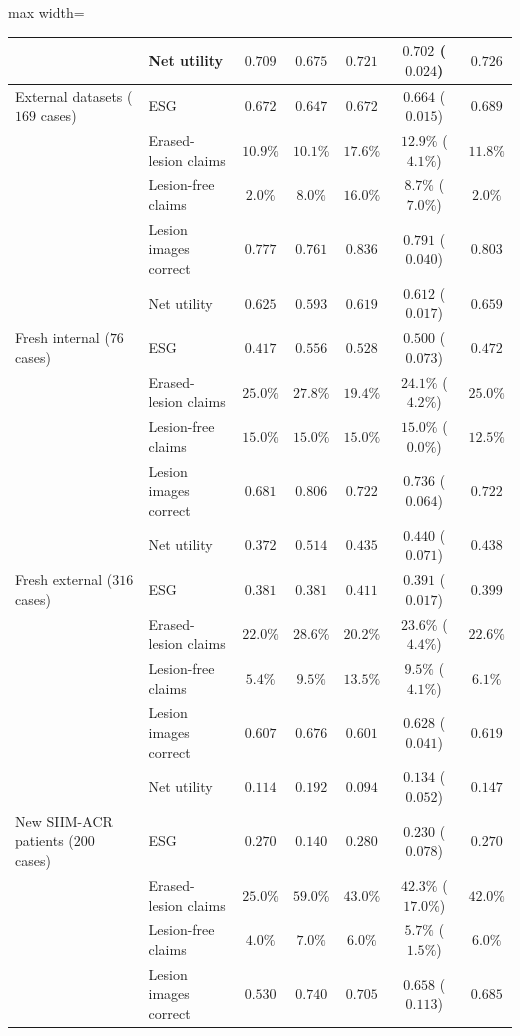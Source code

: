 \begin{table}[!htbp]
\begin{adjustbox}{max width=\linewidth}
\begin{tabular}{ll ccc c c}
 & Net utility & $0.709$ & $0.675$ & $0.721$ & $0.702$ ($0.024$) & $0.726$ \\
\midrule
External datasets ($169$ cases) & ESG & $0.672$ & $0.647$ & $0.672$ & $0.664$ ($0.015$) & $0.689$ \\
 & Erased-lesion claims & $10.9\%$ & $10.1\%$ & $17.6\%$ & $12.9\%$ ($4.1\%$) & $11.8\%$ \\
 & Lesion-free claims & $2.0\%$ & $8.0\%$ & $16.0\%$ & $8.7\%$ ($7.0\%$) & $2.0\%$ \\
 & Lesion images correct & $0.777$ & $0.761$ & $0.836$ & $0.791$ ($0.040$) & $0.803$ \\
 & Net utility & $0.625$ & $0.593$ & $0.619$ & $0.612$ ($0.017$) & $0.659$ \\
\midrule
Fresh internal ($76$ cases) & ESG & $0.417$ & $0.556$ & $0.528$ & $0.500$ ($0.073$) & $0.472$ \\
 & Erased-lesion claims & $25.0\%$ & $27.8\%$ & $19.4\%$ & $24.1\%$ ($4.2\%$) & $25.0\%$ \\
 & Lesion-free claims & $15.0\%$ & $15.0\%$ & $15.0\%$ & $15.0\%$ ($0.0\%$) & $12.5\%$ \\
 & Lesion images correct & $0.681$ & $0.806$ & $0.722$ & $0.736$ ($0.064$) & $0.722$ \\
 & Net utility & $0.372$ & $0.514$ & $0.435$ & $0.440$ ($0.071$) & $0.438$ \\
\midrule
Fresh external ($316$ cases) & ESG & $0.381$ & $0.381$ & $0.411$ & $0.391$ ($0.017$) & $0.399$ \\
 & Erased-lesion claims & $22.0\%$ & $28.6\%$ & $20.2\%$ & $23.6\%$ ($4.4\%$) & $22.6\%$ \\
 & Lesion-free claims & $5.4\%$ & $9.5\%$ & $13.5\%$ & $9.5\%$ ($4.1\%$) & $6.1\%$ \\
 & Lesion images correct & $0.607$ & $0.676$ & $0.601$ & $0.628$ ($0.041$) & $0.619$ \\
 & Net utility & $0.114$ & $0.192$ & $0.094$ & $0.134$ ($0.052$) & $0.147$ \\
\midrule
New SIIM-ACR patients ($200$ cases) & ESG & $0.270$ & $0.140$ & $0.280$ & $0.230$ ($0.078$) & $0.270$ \\
 & Erased-lesion claims & $25.0\%$ & $59.0\%$ & $43.0\%$ & $42.3\%$ ($17.0\%$) & $42.0\%$ \\
 & Lesion-free claims & $4.0\%$ & $7.0\%$ & $6.0\%$ & $5.7\%$ ($1.5\%$) & $6.0\%$ \\
 & Lesion images correct & $0.530$ & $0.740$ & $0.705$ & $0.658$ ($0.113$) & $0.685$ \\

\end{tabular}
\end{adjustbox}
\end{table}
